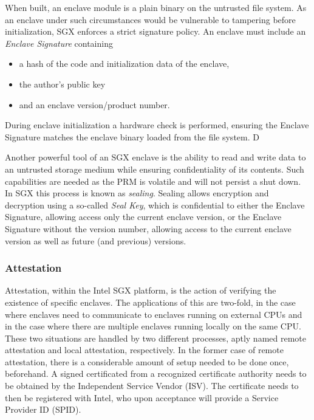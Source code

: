 \documentclass[12pt]{article}
\begin{document}
      When built, an enclave module is a plain binary on the untrusted file system.
      As an enclave under such circumstances would be vulnerable to tampering before initialization, SGX enforces a strict signature policy.
      An enclave must include an \textit{Enclave Signature} containing
      \begin{itemize}
        \item a hash of the code and initialization data of the enclave,
        \item the author's public key
        \item and an enclave version/product number.
      \end{itemize}
      During enclave initialization a hardware check is performed, ensuring the Enclave Signature matches the enclave binary loaded from the file system.
      D

      Another powerful tool of an SGX enclave is the ability to read and write data to an untrusted storage medium while ensuring confidentiality of its contents.
      Such capabilities are needed as the PRM is volatile and will not persist a shut down.
      In SGX this process is known as \textit{sealing}.
      Sealing allows encryption and decryption using a so-called \textit{Seal Key}, which is confidential to either the Enclave Signature, allowing access only the current enclave version, or the Enclave Signature without the version number, allowing access to the current enclave version as well as future (and previous) versions.

			\subsubsection{Attestation}
			Attestation, within the Intel SGX platform, is the action of verifying the existence of specific enclaves.
			The applications of this are two-fold, in the case where enclaves need to communicate to enclaves running on external CPUs and in the case where there are multiple enclaves running locally on the same CPU.
			These two situations are handled by two different processes, aptly named remote attestation and local attestation, respectively.
			In the former case of remote attestation, there is a considerable amount of setup needed to be done once, beforehand.
			A signed certificated from a recognized certificate authority needs to be obtained by the Independent Service Vendor (ISV).
			The certificate needs to then be registered with Intel, who upon acceptance will provide a Service Provider ID (SPID).
\end{document}
